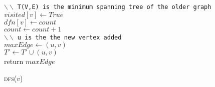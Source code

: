 \documentclass[11pt]{article}
\begin{document}
\begin{algorithm}
$\backslash \backslash $ {\tt{T(V,E) is the minimum spanning tree of the older graph}} \\
$visited[v] \leftarrow True$ \\
$dfn[v] \leftarrow count $ \\
$count \leftarrow count + 1 $ \\
$\backslash \backslash $ {\tt{u is the the new vertex added}} \\
$maxEdge \leftarrow (u,v) $ \\
$T' \leftarrow T' \cup (u,v)$ \\
    return $maxEdge$
\caption{\textsc{dfs(\(v\)) }}
\label{chord_intersection}
\end{algorithm}
\end{document}
